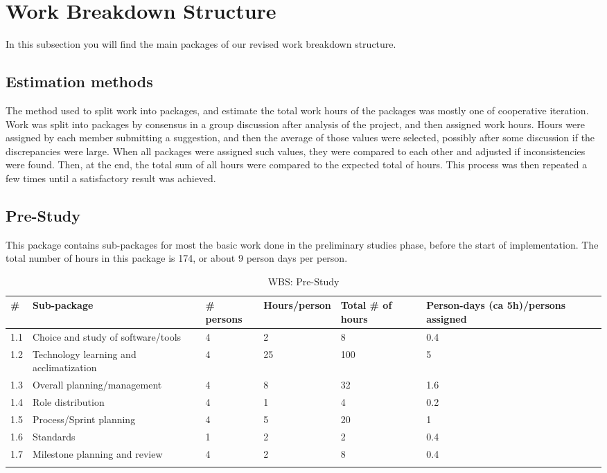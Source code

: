 \section{Work Breakdown Structure}
In this subsection you will find the main packages of our revised work breakdown structure.

\subsection{Estimation methods}

The method used to split work into packages, and estimate the total work hours of the packages was mostly one of cooperative iteration. Work was split into packages by consensus in a group discussion after analysis of the project, and then assigned work hours.
Hours were assigned by each member submitting a suggestion, and then the average of those values were selected, possibly after some discussion if the discrepancies were large. When all packages were assigned such values, they were compared to each other and adjusted if inconsistencies were found. Then, at the end, the total sum of all hours were compared to the expected total of hours. This process was then repeated a few times until a satisfactory result was achieved.

\subsection{Pre-Study}
This package contains sub-packages for most the basic work done in the preliminary studies phase, before the start of implementation. The total number of hours in this package is 174, or about 9 person days per person.
\begin{longtable}{|p{0.7cm}|p{3cm}|p{1.8cm}|p{2.5cm}|p{2cm}|p{2.8cm}|}
\hline
\# & Sub-package & \# persons & Hours/person & Total \# of hours & Person-days (ca 5h)/persons assigned\\ 
\hline
1.1 & Choice and study of software/tools & 4 & 2 & 8 & 0.4\\ 
\hline
1.2 & Technology learning and acclimatization & 4 & 25 & 100 & 5\\ 
\hline
1.3 & Overall planning/management & 4 & 8 & 32 & 1.6\\ 
\hline
1.4 & Role distribution & 4 & 1 & 4 & 0.2\\ 
\hline
1.5 & Process/Sprint planning & 4 & 5 & 20 & 1\\ 
\hline
1.6 & Standards & 1 & 2 & 2 & 0.4\\ 
\hline
1.7 & Milestone planning and review & 4 & 2 & 8 & 0.4\\ 
\hline
\caption{WBS: Pre-Study}
\end{longtable}

